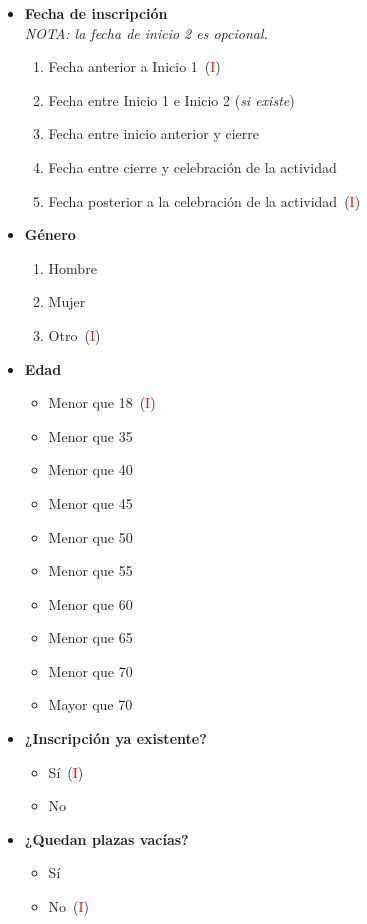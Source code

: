 \begin{itemize}
	\item \textbf{Fecha de inscripción}
		\\\textit{NOTA: la fecha de inicio 2 es opcional.}
		\begin{enumerate}
			\item Fecha anterior a Inicio 1~(\textcolor{red}{I})
			\item Fecha entre Inicio 1 e Inicio 2 (\textit{si existe})
			\item Fecha entre inicio anterior y cierre
			\item Fecha entre cierre y celebración de la actividad
			\item Fecha posterior a la celebración de la actividad~(\textcolor{red}{I})
		\end{enumerate}
	\item \textbf{Género}
		\begin{enumerate}
			\item Hombre
			\item Mujer
			\item Otro~(\textcolor{red}{I})
		\end{enumerate}
	\item \textbf{Edad}
		\begin{itemize}
			\item Menor que 18~(\textcolor{red}{I})
			\item Menor que 35
			\item Menor que 40
			\item Menor que 45
			\item Menor que 50
			\item Menor que 55
			\item Menor que 60
			\item Menor que 65
			\item Menor que 70
			\item Mayor que 70
		\end{itemize}
	\item \textbf{¿Inscripción ya existente?}
			\begin{itemize}
				\item Sí~(\textcolor{red}{I})
				\item No
			\end{itemize}
	\item \textbf{¿Quedan plazas vacías?}
			\begin{itemize}
				\item Sí
				\item No~(\textcolor{red}{I})
			\end{itemize}
\end{itemize}

